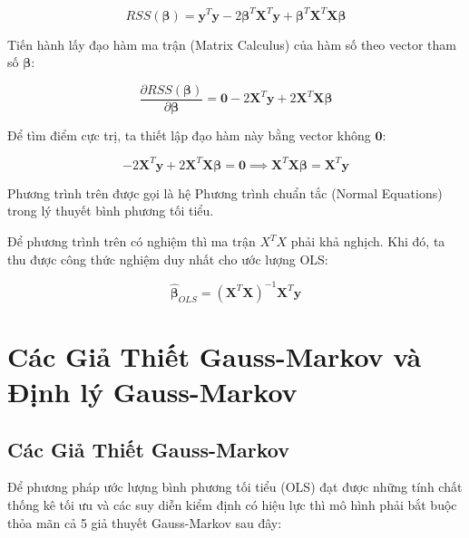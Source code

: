 \begin{equation}
    RSS(\boldsymbol{\beta}) = \mathbf{y}^T\mathbf{y} - 2\boldsymbol{\beta}^T\mathbf{X}^T\mathbf{y} + \boldsymbol{\beta}^T\mathbf{X}^T\mathbf{X}\boldsymbol{\beta}
\end{equation}

Tiến hành lấy đạo hàm ma trận (Matrix Calculus) của hàm số theo vector tham số $\boldsymbol{\beta}$:

\begin{equation}
    \frac{\partial RSS(\boldsymbol{\beta})}{\partial \boldsymbol{\beta}} = \mathbf{0} - 2\mathbf{X}^T\mathbf{y} + 2\mathbf{X}^T\mathbf{X}\boldsymbol{\beta}
\end{equation}

Để tìm điểm cực trị, ta thiết lập đạo hàm này bằng vector không $\mathbf{0}$:

\begin{equation}
    -2\mathbf{X}^T\mathbf{y} + 2\mathbf{X}^T\mathbf{X}\boldsymbol{\beta} = \mathbf{0} \implies \mathbf{X}^T\mathbf{X}\boldsymbol{\beta} = \mathbf{X}^T\mathbf{y}
\end{equation}

Phương trình trên được gọi là hệ Phương trình chuẩn tắc (Normal Equations) trong lý thuyết bình phương tối tiểu.

Để phương trình trên có nghiệm thì ma trận $X^T X$ phải khả nghịch. Khi đó, ta thu được công thức nghiệm duy nhất cho ước lượng OLS:

\begin{equation}
    \hat{\boldsymbol{\beta}}_{OLS} = (\mathbf{X}^T\mathbf{X})^{-1}\mathbf{X}^T\mathbf{y}
\end{equation}

\section{Các Giả Thiết Gauss-Markov và Định lý Gauss-Markov}

\subsection{Các Giả Thiết Gauss-Markov}

Để phương pháp ước lượng bình phương tối tiểu (OLS) đạt được những tính chất thống kê tối ưu và các suy diễn kiểm định có hiệu lực thì mô hình phải bắt buộc thỏa mãn cả 5 giả thuyết Gauss-Markov sau đây:

